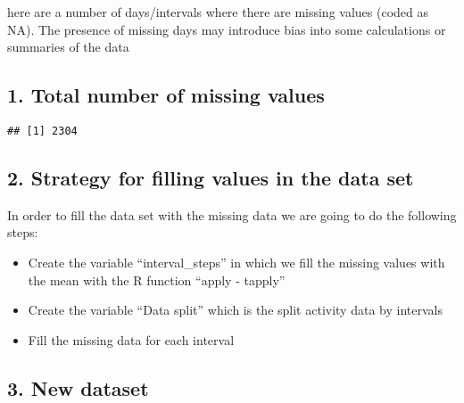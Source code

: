 \documentclass[
]{article}
\newenvironment{Shaded}{\begin{snugshade}}{\end{snugshade}}
\newcommand{\KeywordTok}[1]{\textcolor[rgb]{0.13,0.29,0.53}{\textbf{#1}}}
\newcommand{\NormalTok}[1]{#1}
\newcommand{\OperatorTok}[1]{\textcolor[rgb]{0.81,0.36,0.00}{\textbf{#1}}}
\newcommand{\StringTok}[1]{\textcolor[rgb]{0.31,0.60,0.02}{#1}}
\providecommand{\tightlist}{%
  \setlength{\itemsep}{0pt}\setlength{\parskip}{0pt}}
\begin{document}
here are a number of days/intervals where there are missing values
(coded as \color{red}{\verb|NA|}NA). The presence of missing days may
introduce bias into some calculations or summaries of the data

\hypertarget{total-number-of-missing-values}{%
\subsection{1. Total number of missing
values}\label{total-number-of-missing-values}}

\begin{Shaded}
\end{Shaded}

\begin{verbatim}
## [1] 2304
\end{verbatim}

\hypertarget{strategy-for-filling-values-in-the-data-set}{%
\subsection{2. Strategy for filling values in the data
set}\label{strategy-for-filling-values-in-the-data-set}}

In order to fill the data set with the missing data we are going to do
the following steps:

\begin{itemize}
\tightlist
\item
  Create the variable ``interval\_steps'' in which we fill the missing
  values with the mean with the R function ``apply - tapply''
\item
  Create the variable ``Data split'' which is the split activity data by
  intervals
\item
  Fill the missing data for each interval
\end{itemize}

\hypertarget{new-dataset}{%
\subsection{3. New dataset}\label{new-dataset}}
\end{document}
